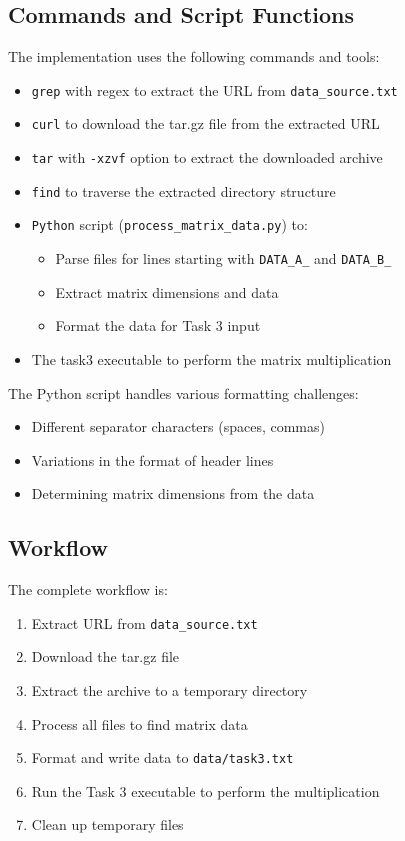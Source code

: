 \documentclass[11pt,a4paper]{article}
\begin{document}
\subsection{Commands and Script Functions}

The implementation uses the following commands and tools:

\begin{itemize}
    \item \texttt{grep} with regex to extract the URL from \texttt{data\_source.txt}
    \item \texttt{curl} to download the tar.gz file from the extracted URL
    \item \texttt{tar} with \texttt{-xzvf} option to extract the downloaded archive
    \item \texttt{find} to traverse the extracted directory structure
    \item \texttt{Python} script (\texttt{process\_matrix\_data.py}) to:
    \begin{itemize}
        \item Parse files for lines starting with \texttt{DATA\_A\_} and \texttt{DATA\_B\_}
        \item Extract matrix dimensions and data
        \item Format the data for Task 3 input
    \end{itemize}
    \item The task3 executable to perform the matrix multiplication
\end{itemize}

The Python script handles various formatting challenges:
\begin{itemize}
    \item Different separator characters (spaces, commas)
    \item Variations in the format of header lines
    \item Determining matrix dimensions from the data
\end{itemize}

\subsection{Workflow}
The complete workflow is:
\begin{enumerate}
    \item Extract URL from \texttt{data\_source.txt}
    \item Download the tar.gz file
    \item Extract the archive to a temporary directory
    \item Process all files to find matrix data
    \item Format and write data to \texttt{data/task3.txt}
    \item Run the Task 3 executable to perform the multiplication
    \item Clean up temporary files
\end{enumerate}
\end{document}
